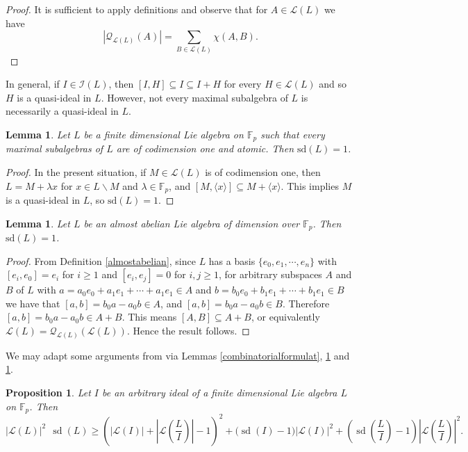 \documentclass{amsart}
\newtheorem{lemma}[theorem]{Lemma}
\newtheorem{proposition}[theorem]{Proposition}
\theoremstyle{definition}
\numberwithin{equation}{section}
\begin{document}
\begin{proof} It is sufficient to apply definitions and observe that for   $A\in \mathcal{L}(L)$ we have
\[  
|\mathcal{Q}_{\mathcal{L}(L)}(A)|=\underset{B\in \mathcal{L}(L) }{\sum} \chi(A,B).
\]
\end{proof}
In general, if $I \in \mathcal{I}(L)$, then  $[I, H]\subseteq I \subseteq I+H$ for every  $H \in \mathcal{L}(L)$ and so $H$ is a quasi-ideal in $L$.  However, not every maximal subalgebra of $L$ is necessarily a quasi-ideal in $L$.

\begin{lemma} \label{codimone1}
Let $L$ be a  finite dimensional Lie algebra on $\mathbb{F}_p$ such that every maximal subalgebras of $L$ are of codimension one and atomic. Then 
$\mathrm{sd}(L)=1$. 
\end{lemma}
\begin{proof}
In the present situation,  if  $M \in \mathcal{L}(L)$ is of codimension one, then $L=M+\lambda x$ for $x\in L \backslash M $ and $\lambda \in \mathbb{F}_p$, and $[M, \langle x\rangle] \subseteq M+ \langle x\rangle$. This implies $M$ is a quasi-ideal in $L$, so  $\mathrm{sd}(L)=1$.
\end{proof}

\begin{lemma} \label{sdandalmost}
Let $L$ be an almost abelian Lie algebra of  dimension  over $\mathbb{F}_p$. Then $\mathrm{sd}(L)=1$. \end{lemma}
\begin{proof}From Definition \ref{almostabelian}, since $L$ has a basis $\{e_0, e_1, \cdots, e_n\}$ with $[e_i,e_0]=e_i$ for $i\geq 1$ and $[e_i,e_j]=0$ for $i, j\geq 1$, for arbitrary subspaces $A$ and $B$ of $L$ with $a=a_0e_0+a_1e_1+\cdots+a_1e_1\in A$ and $b=b_0e_0+b_1e_1+\cdots+b_1e_1\in B$ we have that $[a,b]=b_0a-a_0b\in A$, and $[a,b]=b_0a-a_0b\in B$. Therefore $[a,b]=b_0a-a_0b\in A+B$. This means $[A,B] \subseteq A+B$, or equivalently $\mathcal{L}(L)= \mathcal{Q}_{\mathcal{L}(L)}(\mathcal{L}(L))$. Hence the result follows. \end{proof}

We may adapt some arguments from \cite{or, mt}  via Lemmas \ref{combinatorialformulat}, \ref{codimone1} and \ref{sdandalmost}.

\begin{proposition} \label{boundintermsofideal}
Let $I$ be an arbitrary ideal of a finite dimensional Lie algebra ${L}$ on $\mathbb{F}_p$. Then
 \[
|\mathcal{L}(L)|^2 \ \     \operatorname{sd}(L) \geqslant \left(|\mathcal{L}(I)|+\left|\mathcal{L}\left(\frac{L}{I}\right)\right|-1\right)^2
+\Big(\operatorname{sd}(I)-1\Big)|\mathcal{L}(I)|^2+\left(\operatorname{sd}\left(\frac{L}{I}\right)-1\right)\left|\mathcal{L}\left(\frac{L}{I}\right)\right|^2.\]
\end{proposition}
\end{document}
